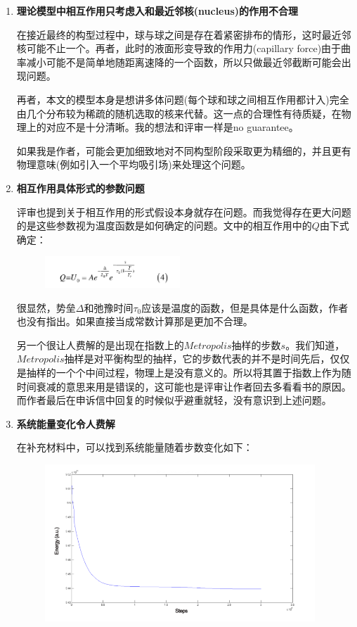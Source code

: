 \documentclass[UTF8]{ctexart}
\begin{document}
	\begin{enumerate}
		\item \textbf{理论模型中相互作用只考虑入和最近邻核(nucleus)的作用不合理}
		
		在接近最终的构型过程中，球与球之间是存在着紧密排布的情形，这时最近邻核可能不止一个。再者，此时的液面形变导致的作用力(capillary force)由于曲率减小可能不是简单地随距离速降的一个函数，所以只做最近邻截断可能会出现问题。
		
		再者，本文的模型本身是想讲多体问题(每个球和球之间相互作用都计入)完全由几个分布较为稀疏的随机选取的核来代替。这一点的合理性有待质疑，在物理上的对应不是十分清晰。我的想法和评审一样是no guarantee。
		
		如果我是作者，可能会更加细致地对不同构型阶段采取更为精细的，并且更有物理意味(例如引入一个平均吸引场)来处理这个问题。
		
			\item \textbf{相互作用具体形式的参数问题}
		
		评审也提到关于相互作用的形式假设本身就存在问题。而我觉得存在更大问题的是这些参数视为温度函数是如何确定的问题。文中的相互作用中的$Q$由下式确定：
		
		
		\begin{figure}[H]
			\centering  %
			\includegraphics[width=2in]{2}
		\end{figure}	
		
		很显然，势垒$\Delta$和弛豫时间$\tau_0$应该是温度的函数，但是具体是什么函数，作者也没有指出。如果直接当成常数计算那是更加不合理。	
		
		另一个很让人费解的是出现在指数上的$Metropolis$抽样的步数$s$。我们知道，$Metropolis$抽样是对平衡构型的抽样，它的步数代表的并不是时间先后，仅仅是抽样的一个个中间过程，物理上是没有意义的。所以将其置于指数上作为随时间衰减的意思来用是错误的，这可能也是评审让作者回去多看看书的原因。而作者最后在申诉信中回复的时候似乎避重就轻，没有意识到上述问题。
		
		\item \textbf{系统能量变化令人费解}
		
		在补充材料中，可以找到系统能量随着步数变化如下：
		
		\begin{figure}[H]
			\centering  %
			\includegraphics[width=4in]{3}
		\end{figure}
		

\end{enumerate}
\end{document}
